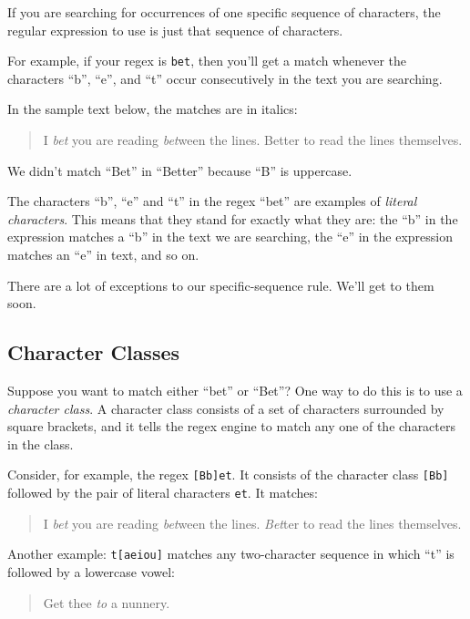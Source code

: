 \documentclass[]{book}
\theoremstyle{definition}
\theoremstyle{definition}
\theoremstyle{remark}
\begin{document}
{If you are searching for occurrences of one specific sequence of
characters, the regular expression to use is just that sequence of
characters.

For example, if your regex is \texttt{bet}, then you'll get a match
whenever the characters ``b'', ``e'', and ``t'' occur consecutively in
the text you are searching.

In the sample text below, the matches are in italics:

\begin{quote}
I \emph{bet} you are reading \emph{bet}ween the lines. Better to read
the lines themselves.
\end{quote}

We didn't match ``Bet'' in ``Better'' because ``B'' is uppercase.

The characters ``b'', ``e'' and ``t'' in the regex ``bet'' are examples
of \emph{literal characters}. This means that
they stand for exactly what they are: the ``b'' in the expression
matches a ``b'' in the text we are searching, the ``e'' in the
expression matches an ``e'' in text, and so on.

There are a lot of exceptions to our specific-sequence rule. We'll get
to them soon.

\subsection{Character Classes}\label{character-classes}

Suppose you want to match either ``bet'' or ``Bet''? One way to do this
is to use a \emph{character class}. A character class
 consists of a set of characters surrounded by
square brackets, and it tells the regex engine to match any one of the
characters in the class.

Consider, for example, the regex \texttt{{[}Bb{]}et}. It consists of the
character class \texttt{{[}Bb{]}} followed by the pair of literal
characters \texttt{et}. It matches:

\begin{quote}
I \emph{bet} you are reading \emph{bet}ween the lines. \emph{Bet}ter to
read the lines themselves.
\end{quote}

Another example: \texttt{t{[}aeiou{]}} matches any two-character
sequence in which ``t'' is followed by a lowercase vowel:

\begin{quote}
Get thee \emph{to} a nunnery.
\end{quote}

}
\end{document}
